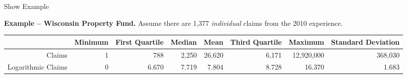 \documentclass[]{book}
\newenvironment{Shaded}{\begin{snugshade}}{\end{snugshade}}
\newcommand{\KeywordTok}[1]{\textcolor[rgb]{0.13,0.29,0.53}{\textbf{{#1}}}}
\newcommand{\DataTypeTok}[1]{\textcolor[rgb]{0.13,0.29,0.53}{{#1}}}
\newcommand{\DecValTok}[1]{\textcolor[rgb]{0.00,0.00,0.81}{{#1}}}
\newcommand{\CharTok}[1]{\textcolor[rgb]{0.31,0.60,0.02}{{#1}}}
\newcommand{\StringTok}[1]{\textcolor[rgb]{0.31,0.60,0.02}{{#1}}}
\newcommand{\OtherTok}[1]{\textcolor[rgb]{0.56,0.35,0.01}{{#1}}}
\newcommand{\NormalTok}[1]{{#1}}
\theoremstyle{definition}
\theoremstyle{definition}
\theoremstyle{definition}
\theoremstyle{remark}
\begin{document}
Show Example

\hypertarget{EXM:S1:SI}{}
\textbf{Example -- Wisconsin Property Fund.} Assume there are 1,377
\emph{individual} claims from the 2010 experience.

\begin{longtable}[]{@{}rrrrrrrr@{}}
\toprule
\begin{minipage}[b]{0.12\columnwidth}\raggedleft\strut
\strut
\end{minipage} & \begin{minipage}[b]{0.12\columnwidth}\raggedleft\strut
Minimum\strut
\end{minipage} & \begin{minipage}[b]{0.12\columnwidth}\raggedleft\strut
First Quartile\strut
\end{minipage} & \begin{minipage}[b]{0.12\columnwidth}\raggedleft\strut
Median\strut
\end{minipage} & \begin{minipage}[b]{0.12\columnwidth}\raggedleft\strut
Mean\strut
\end{minipage} & \begin{minipage}[b]{0.12\columnwidth}\raggedleft\strut
Third Quartile\strut
\end{minipage} & \begin{minipage}[b]{0.12\columnwidth}\raggedleft\strut
Maximum\strut
\end{minipage} & \begin{minipage}[b]{0.12\columnwidth}\raggedleft\strut
Standard Deviation\strut
\end{minipage}\tabularnewline
\midrule
\endhead
Claims & 1 & 788 & 2,250 & 26,620 & 6,171 & 12,920,000 &
368,030\tabularnewline
Logarithmic Claims & 0 & 6.670 & 7.719 & 7.804 & 8.728 & 16.370 &
1.683\tabularnewline
\bottomrule
\end{longtable}

\begin{Shaded}
\end{Shaded}
\end{document}
